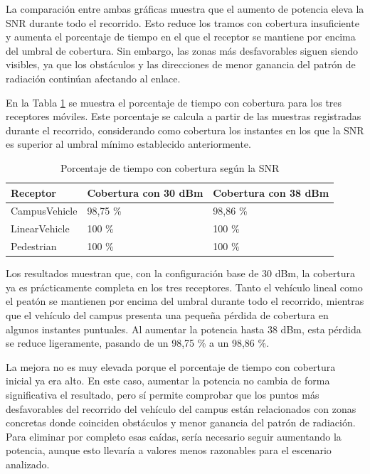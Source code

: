 La comparación entre ambas gráficas muestra que el aumento de potencia eleva la SNR durante todo el recorrido. Esto reduce los tramos con cobertura insuficiente y aumenta el porcentaje de tiempo en el que el receptor se mantiene por encima del umbral de cobertura. Sin embargo, las zonas más desfavorables siguen siendo visibles, ya que los obstáculos y las direcciones de menor ganancia del patrón de radiación continúan afectando al enlace.

En la Tabla \ref{tab:cobertura_snr} se muestra el porcentaje de tiempo con cobertura para los tres receptores móviles. Este porcentaje se calcula a partir de las muestras registradas durante el recorrido, considerando como cobertura los instantes en los que la SNR es superior al umbral mínimo establecido anteriormente.

\begin{table}[H]
    \centering
    \begin{tabularx}{\textwidth}{@{}lXX@{}}
        \toprule
        \textbf{Receptor} & \textbf{Cobertura con 30 dBm} & \textbf{Cobertura con 38 dBm}\\
        \midrule
        CampusVehicle & 98,75 \% & 98,86 \% \\
        LinearVehicle & 100 \% & 100 \% \\
        Pedestrian & 100 \% & 100 \% \\
        \bottomrule
    \end{tabularx}
    \caption{Porcentaje de tiempo con cobertura según la SNR}
    \label{tab:cobertura_snr}
\end{table}

Los resultados muestran que, con la configuración base de 30 dBm, la cobertura ya es prácticamente completa en los tres receptores. Tanto el vehículo lineal como el peatón se mantienen por encima del umbral durante todo el recorrido, mientras que el vehículo del campus presenta una pequeña pérdida de cobertura en algunos instantes puntuales. Al aumentar la potencia hasta 38 dBm, esta pérdida se reduce ligeramente, pasando de un 98,75 \% a un 98,86 \%.

La mejora no es muy elevada porque el porcentaje de tiempo con cobertura inicial ya era alto. En este caso, aumentar la potencia no cambia de forma significativa el resultado, pero sí permite comprobar que los puntos más desfavorables del recorrido del vehículo del campus están relacionados con zonas concretas donde coinciden obstáculos y menor ganancia del patrón de radiación. Para eliminar por completo esas caídas, sería necesario seguir aumentando la potencia, aunque esto llevaría a valores menos razonables para el escenario analizado.

